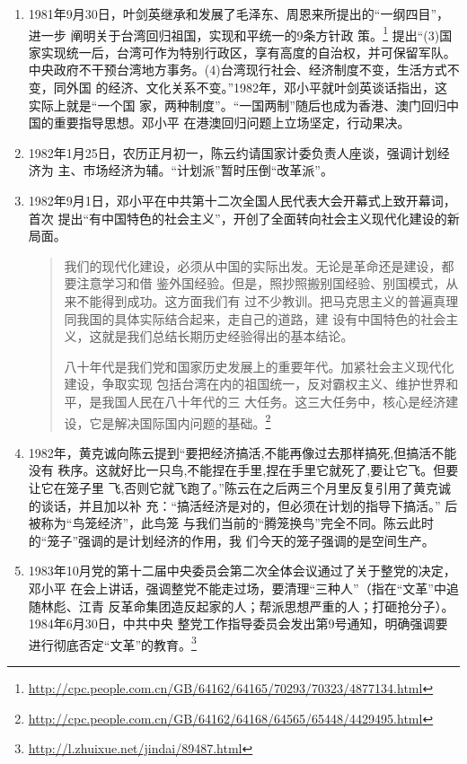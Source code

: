 \begin{enumerate}
\item 1981年9月30日，叶剑英继承和发展了毛泽东、周恩来所提出的“一纲四目”，进一步
  阐明关于台湾回归祖国，实现和平统一的9条方针政
  策。\footnote{\url{http://cpc.people.com.cn/GB/64162/64165/70293/70323/4877134.html}}
  提出“(3)国家实现统一后，台湾可作为特别行政区，享有高度的自治权，并可保留军队。
  中央政府不干预台湾地方事务。(4)台湾现行社会、经济制度不变，生活方式不变，同外国
  的经济、文化关系不变。”1982年，邓小平就叶剑英谈话指出，这实际上就是“一个国
  家，两种制度”。“一国两制”随后也成为香港、澳门回归中国的重要指导思想。邓小平
  在港澳回归问题上立场坚定，行动果决。

\item 1982年1月25日，农历正月初一，陈云约请国家计委负责人座谈，强调计划经济为
    主、市场经济为辅。“计划派”暂时压倒“改革派”。

\item 1982年9月1日，邓小平在中共第十二次全国人民代表大会开幕式上致开幕词，首次
  提出“有中国特色的社会主义”，开创了全面转向社会主义现代化建设的新局面。
  \begin{quotation}
    我们的现代化建设，必须从中国的实际出发。无论是革命还是建设，都要注意学习和借
    鉴外国经验。但是，照抄照搬别国经验、别国模式，从来不能得到成功。这方面我们有
    过不少教训。把马克思主义的普遍真理同我国的具体实际结合起来，走自己的道路，建
    设有中国特色的社会主义，这就是我们总结长期历史经验得出的基本结论。

    八十年代是我们党和国家历史发展上的重要年代。加紧社会主义现代化建设，争取实现
    包括台湾在内的祖国统一，反对霸权主义、维护世界和平，是我国人民在八十年代的三
    大任务。这三大任务中，核心是经济建设，它是解决国际国内问题的基础。\footnote{\url{http://cpc.people.com.cn/GB/64162/64168/64565/65448/4429495.html}}
  \end{quotation}

\item 1982年，黄克诚向陈云提到“要把经济搞活,不能再像过去那样搞死,但搞活不能没有
  秩序。这就好比一只鸟,不能捏在手里,捏在手里它就死了,要让它飞。但要让它在笼子里
  飞,否则它就飞跑了。”陈云在之后两三个月里反复引用了黄克诚的谈话，并且加以补
  充：“搞活经济是对的，但必须在计划的指导下搞活。” 后被称为“鸟笼经济”，此鸟笼
  与我们当前的“腾笼换鸟”完全不同。陈云此时的“笼子”强调的是计划经济的作用，我
  们今天的笼子强调的是空间生产。\cite{niaolongjingji}

\item 1983年10月党的第十二届中央委员会第二次全体会议通过了关于整党的决定，邓小平
  在会上讲话，强调整党不能走过场，要清理“三种人”（指在“文革”中追随林彪、江青
  反革命集团造反起家的人；帮派思想严重的人；打砸抢分子）。1984年6月30日，中共中央
  整党工作指导委员会发出第9号通知，明确强调要进行彻底否定“文革”的教育。\footnote{\url{http://l.zhuixue.net/jindai/89487.html}}


\end{enumerate}
